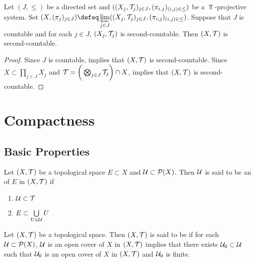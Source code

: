 \documentclass{book}
\begin{document}
\begin{ex} 
	Let $(J, {\leq})$ be a directed set and $((X_j, \mathcal{T}_j)_{j \in J}, (\pi_{i,j})_{(i,j) \in {\leq}})$ be a $\Top$-projective system. Set $(X, (\pi_j)_{j \in J}) \defeq \varprojlim\limits_{j \in J} ((X_j, \MT_j)_{j \in J}, (\pi_{i,j})_{(i,j) \in {\leq}})$. Suppose that $J$ is countable and for each $j \in J$, $(X_j, \mathcal{T}_j)$ is second-countable. Then $(X, \mathcal{T})$ is second-countable.
\end{ex}

\begin{proof}
	Since $J$ is countable,  implies that $(X, \mathcal{T})$ is second-countable. Since $X \subset \prod\limits_{j \in J} X_j$ and $\mathcal{T} = \bigg( \bigotimes_{j \in J} \mathcal{T}_j \bigg) \cap X$,  implies that $(X, \mathcal{T})$ is second-countable. 
\end{proof}
	
	
	
	
	
	
	
	
	
	
	
	
	
	\newpage
	\section{Compactness}
	
	\subsection{Basic Properties}
	
	\begin{defn} 
		Let $(X, \mathcal{T})$ be a topological space $E \subset X$ and $\mathcal{U} \subset \mathcal{P}(X)$. Then $\mathcal{U}$ is said to be an  of $E$ in $(X, \mathcal{T})$ if 
		\begin{enumerate}
			\item $\mathcal{U} \subset \mathcal{T}$ 
			\item $E \subset \bigcup\limits_{U \in \mathcal{U}} U$
		\end{enumerate}
	\end{defn}

	\begin{defn} 
		Let $(X, \mathcal{T})$ be a topological space. Then $(X, \mathcal{T})$ is said to be  if for each $\mathcal{U} \subset \mathcal{P}(X)$, $\mathcal{U}$ is an open cover of $X$ in $(X, \mathcal{T})$ implies that there exists $\mathcal{U}_0 \subset \mathcal{U}$ such that $\mathcal{U}_0$ is an open cover of $X$ in $(X, \mathcal{T})$ and $\mathcal{U}_0$ is finite.
	\end{defn}
\end{document}

